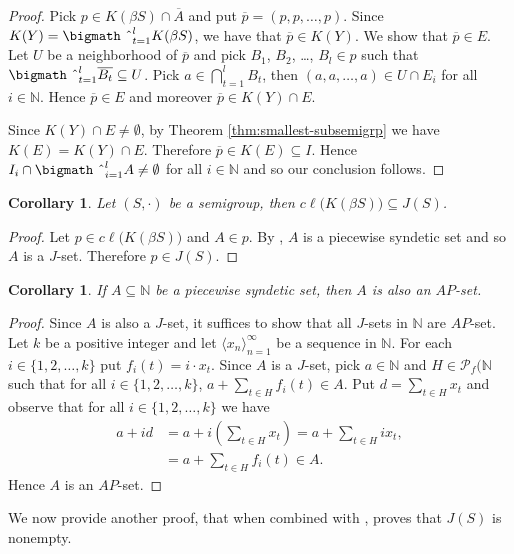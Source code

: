 \documentclass[12pt,showtrims]{memoir}
\theoremstyle{plain}
\newtheorem{cor}[thm]{Corollary}
\theoremstyle{definition}
\newcommand{\la}{\langle}
\newcommand{\ra}{\rangle}
\newcommand{\bbN}{\mathbb{N}}
\newcommand{\Pf}{\mathcal{P}_f}
\newcommand{\bigtimes}{\hbox{\bigmath \char'2}}
\begin{document}
\begin{proof}
  Pick $p \in K(\beta S) \cap \overline{A}$ and put $\overline{p} = (p, p, \ldots, p)$. 
  Since $K(Y) = \bigtimes_{t=1}^l K(\beta S)$, we have that $\overline{p} \in K(Y)$. 
  We show that $\overline{p} \in E$.
  Let $U$ be a neighborhood of $\overline{p}$ and pick $B_1$, $B_2$, \dots, $B_l \in p$ such that $\bigtimes_{t=1}^l \overline{B_t} \subseteq U$. 
  Pick $a \in \bigcap_{t=1}^l B_t$, then $(a, a, \ldots, a) \in U \cap E_i$ for all $i \in \bbN$. 
  Hence $\overline{p} \in E$ and moreover $\overline{p} \in K(Y) \cap E$.

  Since $K(Y) \cap E \ne \emptyset$, by Theorem \ref{thm:smallest-subsemigrp} we have $K(E) = K(Y) \cap E$.
  Therefore $\overline{p} \in K(E) \subseteq I$.
  Hence $I_i \cap \bigtimes_{i=1}^l A \ne \emptyset$ for all $i \in \bbN$ and so our conclusion follows.
\end{proof}

\begin{cor}
  Let $(S, \cdot)$ be a semigroup, then $c\ell\bigl( K(\beta S) \bigr) \subseteq J(S)$.
\end{cor}
\begin{proof}
  Let $p \in c\ell\bigl( K(\beta S) \bigr)$ and $A \in p$.
  By \cite[Corollary 4.41]{Hindman:1998fk}, $A$ is a piecewise syndetic set and so $A$ is a $J$-set.
  Therefore $p \in J(S)$.
\end{proof}

\begin{cor}
  If $A \subseteq \bbN$ be a piecewise syndetic set, then $A$ is also an $AP$-set. 
\end{cor}
\begin{proof}
  Since $A$ is also a $J$-set, it suffices to show that all $J$-sets in $\bbN$ are $AP$-set. 
  Let $k$ be a positive integer and let $\la x_n \ra_{n=1}^\infty$ be a sequence in $\bbN$. 
  For each $i \in \{1, 2, \ldots, k\}$ put $f_i(t) = i \cdot x_t$.
  Since $A$ is a $J$-set, pick $a \in \bbN$ and $H \in \Pf(\bbN$ such that for all $i \in \{1, 2, \ldots, k\}$, $a + \sum_{t \in H} f_i(t) \in A$. 
  Put $d = \sum_{t \in H} x_t$ and observe that for all $i \in \{1, 2, \ldots, k\}$ we have
  \begin{align*}
    a+id &= \textstyle a+ i(\sum_{t \in H} x_t) = a + \sum_{t \in H} ix_t, \\
    &= \textstyle a + \sum_{t \in H} f_i(t) \in A. 
  \end{align*}
  Hence $A$ is an $AP$-set.
\end{proof}

We now provide another proof, that when combined with \cite[Theorem 3.11]{Hindman:1998fk}, proves that $J(S)$ is nonempty.
\end{document}
